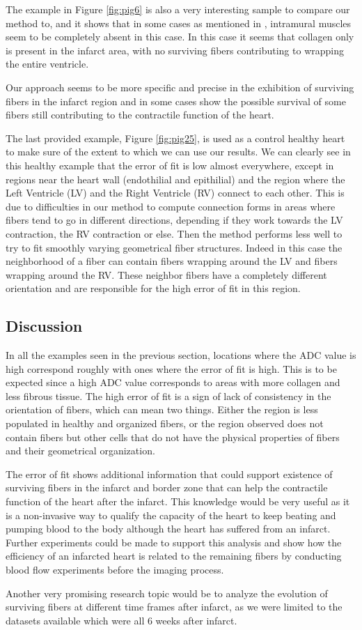 The example in Figure \ref{fig:pig6} is also a very interesting sample to compare our method to, and it shows that in some cases as mentioned in \cite{ursell1985structural}, intramural muscles seem to be completely absent in this case. In this case it seems that collagen only is present in the infarct area, with no surviving fibers contributing to wrapping the entire ventricle.

Our approach seems to be more specific and precise in the exhibition of surviving fibers in the infarct region and in some cases show the possible survival of some fibers still contributing to the contractile function of the heart.

The last provided example, Figure \ref{fig:pig25}, is used as a control healthy heart to make sure of the extent to which we can use our results. We can clearly see in this healthy example that the error of fit is low almost everywhere, except in regions near the heart wall (endothilial and epithilial) and the region where the Left Ventricle (LV) and the Right Ventricle (RV) connect to each other. This is due to difficulties in our method to compute connection forms in areas where fibers tend to go in different directions, depending if they work towards the LV contraction, the RV contraction or else. Then the method performs less well to try to fit smoothly varying geometrical fiber structures. Indeed in this case the neighborhood of a fiber can contain fibers wrapping around the LV and fibers wrapping around the RV. These neighbor fibers have a completely different orientation and are responsible for the high error of fit in this region.

\subsection{Discussion}

In all the examples seen in the previous section, locations where the ADC value is high correspond roughly with ones where the error of fit is high. This is to be expected since a high ADC value corresponds to areas with more collagen and less fibrous tissue. The high error of fit is a sign of lack of consistency in the orientation of fibers, which can mean two things. Either the region is less populated in healthy and organized fibers, or the region observed does not contain fibers but other cells that do not have the physical properties of fibers and their geometrical organization.

The error of fit shows additional information that could support existence of surviving fibers in the infarct and border zone that can help the contractile function of the heart after the infarct. This knowledge would be very useful as it is a non-invasive way to qualify the capacity of the heart to keep beating and pumping blood to the body although the heart has suffered from an infarct. Further experiments could be made to support this analysis and show how the efficiency of an infarcted heart is related to the remaining fibers by conducting blood flow experiments before the imaging process.

Another very promising research topic would be to analyze the evolution of surviving fibers at different time frames after infarct, as we were limited to the datasets available which were all 6 weeks after infarct.
